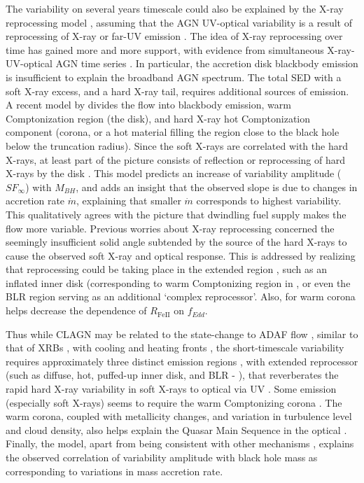 \documentclass[twocolumn]{aastex62}
\begin{document}
The variability on several years timescale could also be explained by the X-ray reprocessing model \citep{kokubo2015, kubota2018}, assuming that the AGN UV-optical variability is a result of reprocessing of X-ray or far-UV emission \citep{krolik1991}.  The idea of X-ray reprocessing  over time has gained more and more support, with evidence from simultaneous X-ray-UV-optical AGN time series \citep{edelson2014, mchardy2018,  zhu2018}. In particular, the accretion disk blackbody emission is insufficient to explain the broadband AGN spectrum. The total SED with a soft X-ray excess, and a hard X-ray tail, requires additional sources of emission. A recent model by \citet{kubota2018} divides the flow into blackbody emission, warm Comptonization region (the disk), and hard X-ray hot Comptonization component (corona, or a hot material filling the region close to the black hole below the truncation radius).  Since the soft X-rays are correlated with the hard X-rays, at least part of the picture consists of reflection or reprocessing of hard X-rays by the disk \citep{lawrence2018}. This model predicts an increase of variability amplitude ($SF_{\infty}$) with $M_{BH}$, and adds an insight that the observed slope is due to changes in accretion rate $\dot{m}$, explaining that smaller $\dot{m}$ corresponds to highest variability. This qualitatively agrees with the picture that dwindling fuel supply makes the flow more variable. Previous worries about X-ray reprocessing concerned the seemingly insufficient solid angle subtended by the source of the hard X-rays to cause the observed soft X-ray and optical response. This is addressed by realizing that reprocessing could be taking place in the extended region \citep{gardner2017}, such as an inflated inner disk (corresponding to warm Comptonizing region in \citealt{kubota2018}, or even the BLR region serving as an additional `complex reprocessor'\citep{mchardy2018}. Also, for \citet{panda2019a} warm corona helps decrease the dependence of $R_{\mathrm{Fe  II}}$ on $f_{Edd}$. 

Thus while CLAGN may be related to the state-change to ADAF flow \citep{sniegowska2019}, similar to that of XRBs \citep{noda2018,ruan2019}, with cooling and heating fronts \citep{ross2018}, the short-timescale variability requires approximately three distinct emission regions \citep{kubota2018}, with extended reprocessor (such as diffuse, hot, puffed-up inner disk, and BLR - \citealt{mchardy2018}), that reverberates the rapid hard X-ray variability in soft X-rays to optical via UV \citep{fausnaugh2018}. Some emission (especially soft X-rays) seems to require the warm Comptonizing corona \citep{kubota2018}. The warm corona, coupled with metallicity changes, and variation in turbulence level and cloud density, also helps explain the Quasar Main Sequence in the optical \citep{panda2019a,panda2019b}. Finally, the \citet{kubota2018} model, apart from being consistent with other mechanisms \citep{mchardy2018, panda2019a, sniegowska2019, lawrence2018, ross2018, ruan2019}, explains the observed correlation of variability amplitude with black hole mass as corresponding to variations in mass accretion rate. 
\end{document}
